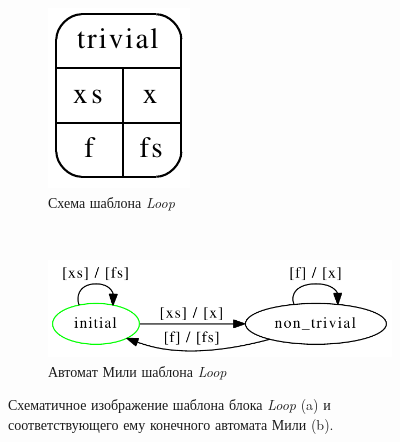 \documentclass[10pt,a4paper]{article}
\begin{document}
\begin{figure}[H]
  \centering

  \begin{subfigure}[b]{0.2\textwidth}
    \centering
    \includegraphics[width=\textwidth]{map_cg.pdf}
    \caption{Схема шаблона \textit{Loop}}
    \label{map:connection}
  \end{subfigure}
  ~
  \begin{subfigure}[b]{0.7\textwidth}
    \centering
    \includegraphics[width=\textwidth]{map_fa.pdf}
    \caption{Автомат Мили шаблона \textit{Loop}}
    \label{map:fa}
  \end{subfigure}
  
  \caption{Схематичное изображение шаблона блока \textit{Loop} (a) и соответствующего ему конечного автомата Мили (b).}
  \label{map}
\end{figure}
\end{document}
